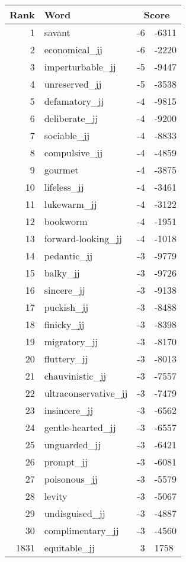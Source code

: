 \begin{longtable}[!htbp]{| rlr@{.}l |}
    \hline
    \textbf{Rank} & \textbf{Word} & \multicolumn{2}{c|}{\textbf{Score}} \\
    \hline
    \endhead
    1 & savant & -6 & -6311 \\
    2 & economical\_jj & -6 & -2220 \\
    3 & imperturbable\_jj & -5 & -9447 \\
    4 & unreserved\_jj & -5 & -3538 \\
    5 & defamatory\_jj & -4 & -9815 \\
    6 & deliberate\_jj & -4 & -9200 \\
    7 & sociable\_jj & -4 & -8833 \\
    8 & compulsive\_jj & -4 & -4859 \\
    9 & gourmet & -4 & -3875 \\
    10 & lifeless\_jj & -4 & -3461 \\
    11 & lukewarm\_jj & -4 & -3122 \\
    12 & bookworm & -4 & -1951 \\
    13 & forward-looking\_jj & -4 & -1018 \\
    14 & pedantic\_jj & -3 & -9779 \\
    15 & balky\_jj & -3 & -9726 \\
    16 & sincere\_jj & -3 & -9138 \\
    17 & puckish\_jj & -3 & -8488 \\
    18 & finicky\_jj & -3 & -8398 \\
    19 & migratory\_jj & -3 & -8170 \\
    20 & fluttery\_jj & -3 & -8013 \\
    21 & chauvinistic\_jj & -3 & -7557 \\
    22 & ultraconservative\_jj & -3 & -7479 \\
    23 & insincere\_jj & -3 & -6562 \\
    24 & gentle-hearted\_jj & -3 & -6557 \\
    25 & unguarded\_jj & -3 & -6421 \\
    26 & prompt\_jj & -3 & -6081 \\
    27 & poisonous\_jj & -3 & -5579 \\
    28 & levity & -3 & -5067 \\
    29 & undisguised\_jj & -3 & -4887 \\
    30 & complimentary\_jj & -3 & -4560 \\
    1831 & equitable\_jj & 3 & 1758 \\

\end{longtable}
